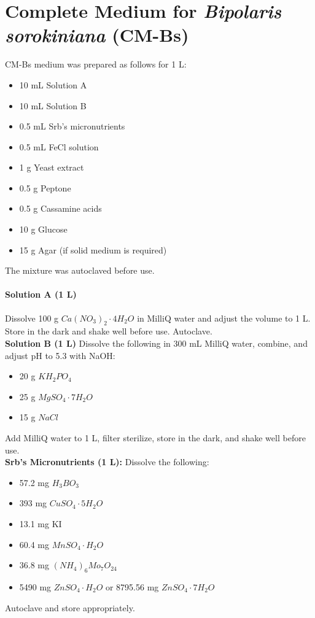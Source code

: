 \appendix
\appendixpage
\addappheadtotoc
\section{Complete Medium for \textit{Bipolaris sorokiniana} (CM-Bs)}

CM-Bs medium was prepared as follows for 1 L:
\begin{itemize}[nosep]
    \item 10 mL Solution A
    \item 10 mL Solution B
    \item 0.5 mL Srb's micronutrients
    \item 0.5 mL FeCl solution
    \item 1 g Yeast extract
    \item 0.5 g Peptone
    \item 0.5 g Cassamine acids
    \item 10 g Glucose
    \item 15 g Agar (if solid medium is required)
\end{itemize}
The mixture was autoclaved before use.

\paragraph{Solution A (1 L)}
Dissolve 100 g $Ca(NO_3)_2 \cdot 4H_2O$ in MilliQ water and adjust the volume to 1 L. Store in the dark and shake well before use. Autoclave.
\\
\textbf{Solution B (1 L)}
Dissolve the following in 300 mL MilliQ water, combine, and adjust pH to 5.3 with NaOH:
\begin{itemize}[nosep]
    \item 20 g $KH_2PO_4$
    \item 25 g $MgSO_4 \cdot 7H_2O$
    \item 15 g $NaCl$
\end{itemize}
Add MilliQ water to 1 L, filter sterilize, store in the dark, and shake well before use.
\\
\textbf{Srb's Micronutrients (1 L):}
Dissolve the following:
\begin{itemize}[nosep]
    \item 57.2 mg $H_3BO_3$
    \item 393 mg $CuSO_4 \cdot 5H_2O$
    \item 13.1 mg KI
    \item 60.4 mg $MnSO_4 \cdot H_2O$
    \item 36.8 mg $(NH_4)_6Mo_7O_{24}$
    \item 5490 mg $ZnSO_4 \cdot H_2O$ or 8795.56 mg $ZnSO_4 \cdot 7H_2O$
\end{itemize}
Autoclave and store appropriately.